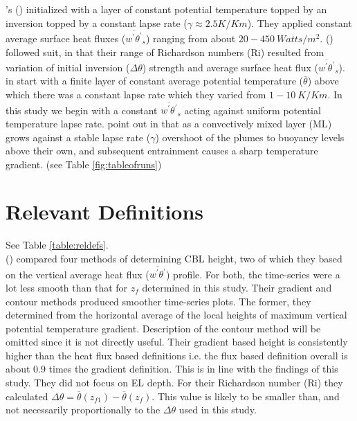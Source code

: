 \citeauthor{SullMoengStev}'s (\cite{SullMoengStev}) initialized with a layer of constant potential temperature topped by an inversion topped by a constant lapse rate ($\gamma \approx 2.5 K/Km$). They applied constant average surface heat fluxes ($\overline{w^{'}\theta^{'}}_{s}$) ranging from about $20 - 450 \ Watts/m^{2}$. \citeauthor{BrooksFowler2} (\cite{BrooksFowler2}) followed suit, in that their range of Richardson numbers (\acs{Ri}) resulted from variation of initial inversion ($\Delta \theta$) strength and average surface heat flux ($\overline{w^{'}\theta^{'}}_{s}$).  \citeauthor{FedConzMir04} in \cite{FedConzMir04} start with a finite layer of constant average potential temperature ($\overline{\theta}$) above which there was a constant lapse rate which they varied from  $1 - 10 \ K/Km$. In this study we begin with a constant $\overline{w^{'}\theta^{'}}_{s}$ acting against uniform potential temperature lapse rate.  \citeauthor{SchmidtSchu} point out in \cite{SchmidtSchu} that as a convectively mixed layer (\acs{ML}) grows against a stable lapse rate ($\gamma$) overshoot of the plumes to buoyancy levels above their own, and subsequent entrainment causes a sharp temperature gradient. (see Table \ref{fig:tableofruns}) 


\section{Relevant Definitions}

\FloatBarrier

See Table \ref{table:reldefs}.\\

\citeauthor{SullMoengStev} (\cite{SullMoengStev}) compared four methods of determining \acs{CBL} height, two of which they based on the vertical average heat flux ($\overline{w^{'}\theta^{'}}$) profile. For both, the time-series were a lot less smooth than that for $z_{f}$ determined in this study.  Their gradient and contour methods produced smoother time-series plots.  The former, they determined from the horizontal average of the local heights of maximum vertical potential temperature gradient.  Description of the contour method will be omitted since it is not directly useful. Their gradient based height is consistently higher than the heat flux based definitions i.e. the flux based definition overall is about 0.9 times the gradient definition. This is in line with the findings of this study. They did not focus on \acs{EL} depth. For their Richardson number (\acs{Ri}) they calculated $\Delta \theta = \overline{\theta}(z_{f1})-\overline{\theta}(z_{f})$.  This value is likely to be smaller than, and not necessarily proportionally to the $\Delta \theta$ used in this study. \\

